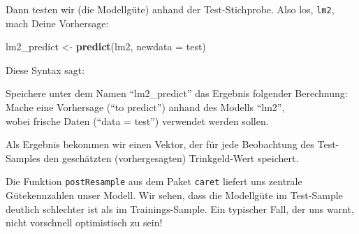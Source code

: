 \documentclass[12pt,ngerman,]{book}
\newenvironment{Shaded}{\begin{snugshade}}{\end{snugshade}}
\newcommand{\KeywordTok}[1]{\textcolor[rgb]{0.13,0.29,0.53}{\textbf{{#1}}}}
\newcommand{\DataTypeTok}[1]{\textcolor[rgb]{0.13,0.29,0.53}{{#1}}}
\newcommand{\DecValTok}[1]{\textcolor[rgb]{0.00,0.00,0.81}{{#1}}}
\newcommand{\StringTok}[1]{\textcolor[rgb]{0.31,0.60,0.02}{{#1}}}
\newcommand{\CommentTok}[1]{\textcolor[rgb]{0.56,0.35,0.01}{\textit{{#1}}}}
\newcommand{\OtherTok}[1]{\textcolor[rgb]{0.56,0.35,0.01}{{#1}}}
\newcommand{\NormalTok}[1]{{#1}}
\renewenvironment{Shaded}{\begin{kframe}}{\end{kframe}}
\let\BeginKnitrBlock\begin \let\EndKnitrBlock\end
\begin{document}
\begin{Shaded}
\end{Shaded}

Dann testen wir (die Modellgüte) anhand der Test-Stichprobe. Also los,
\texttt{lm2}, mach Deine Vorhersage:

\begin{Shaded}
\begin{Highlighting}[]
\NormalTok{lm2_predict <-}\StringTok{ }\KeywordTok{predict}\NormalTok{(lm2, }\DataTypeTok{newdata =} \NormalTok{test)}
\end{Highlighting}
\end{Shaded}

Diese Syntax sagt:

\BeginKnitrBlock{rmdpseudocode}
Speichere unter dem Namen ``lm2\_predict'' das Ergebnis folgender
Berechnung:\\
Mache eine Vorhersage (``to predict'') anhand des Modells ``lm2'',\\
wobei frische Daten (``data = test'') verwendet werden sollen.
\EndKnitrBlock{rmdpseudocode}

Als Ergebnis bekommen wir einen Vektor, der für jede Beobachtung des
Test-Samples den geschätzten (vorhergesagten) Trinkgeld-Wert speichert.

\begin{Shaded}
\end{Shaded}

Die Funktion \texttt{postResample} aus dem Paket \texttt{caret} liefert
uns zentrale Gütekennzahlen unser Modell. Wir sehen, dass die Modellgüte
im Test-Sample deutlich schlechter ist als im Trainings-Sample. Ein
typischer Fall, der uns warnt, nicht vorschnell optimistisch zu sein!
\end{document}
